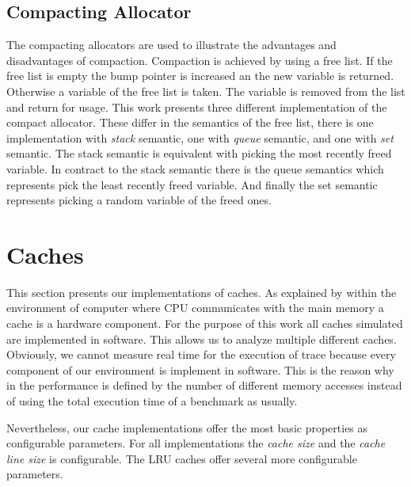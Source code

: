 \documentclass[onecolumn, openright, master, english, signatures]{dbrgrptt}
\begin{document}
\subsection{Compacting Allocator}\label{ssec:allocator-compact}

The compacting allocators are used to illustrate the advantages and disadvantages of compaction. Compaction is achieved by using a free list. If the free list is empty the bump pointer is increased an the new variable is returned. Otherwise a variable of the free list is taken. The variable is removed from the list and return for usage. This work presents three different implementation of the compact allocator. These differ in the semantics of the free list, there is one implementation with \emph{stack} semantic, one with \emph{queue} semantic, and one with \emph{set} semantic. The stack semantic is equivalent with picking the most recently freed variable. In contract to the stack semantic there is the queue semantics which represents pick the least recently freed variable. And finally the set semantic represents picking a random variable of the freed ones.


\section{Caches}\label{sec:caches}

This section presents our implementations of caches. As explained by  within the environment of computer where \ac{CPU} communicates with the main memory a cache is a hardware component. For the purpose of this work all caches simulated are implemented in software. This allows us to analyze multiple different caches. Obviously, we cannot measure real time for the execution of \ac{trace} because every component of our environment is implement in software. This is the reason why in  the performance is defined by the number of different memory accesses instead of using the total execution time of a benchmark as usually.

Nevertheless, our cache implementations offer the most basic properties as configurable parameters.
For all implementations the \emph{cache size} and the \emph{cache line size} is configurable.
The \ac{LRU} caches offer several more configurable parameters.
\end{document}
